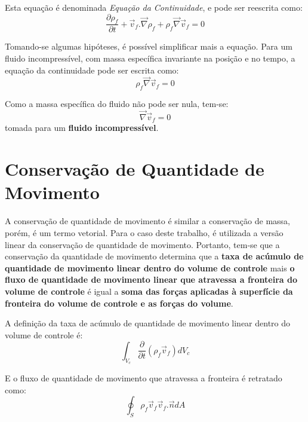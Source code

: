 Esta equação é denominada \textit{Equação da Continuidade}, e pode ser reescrita como:
\begin{equation}
    \dfrac{\partial \rho_f}{\partial t} + \vec{v}_f.\vec{\nabla} \rho_f + \rho_f \vec{\nabla}\vec{v}_f = 0
    \label{continuity}
\end{equation}

Tomando-se algumas hipóteses, é possível simplificar mais a equação.
Para um fluido incompressível, com massa específica invariante na posição e no tempo, a equação da continuidade pode ser escrita como:
\begin{equation}
    \rho_f \vec{\nabla}\vec{v}_f = 0
    \label{continuity_mid}
\end{equation}

Como a massa específica do fluido não pode ser nula, tem-se:
\begin{equation}
    \vec{\nabla}\vec{v}_f = 0
    \label{continuity_final}
\end{equation}
tomada para um \textbf{fluido incompressível}.


\section{\textbf{Conservação de Quantidade de Movimento}}
\label{sec_cons_qmov}
A conservação de quantidade de movimento é similar a conservação de massa, porém, é um termo vetorial.
Para o caso deste trabalho, é utilizada a versão linear da conservação de quantidade de movimento.
Portanto, tem-se que a conservação da quantidade de movimento determina que a \textbf{taxa de acúmulo de quantidade de movimento linear dentro do volume de controle} mais \textbf{o fluxo de quantidade de movimento linear que atravessa a fronteira do volume de controle} é igual a \textbf{soma das forças aplicadas à superfície da fronteira do volume de controle e as forças do volume}.

A definição da taxa de acúmulo de quantidade de movimento linear dentro do volume de controle é:
\begin{equation}
    \int_{V_c}\dfrac{\partial}{\partial t} (\rho_f \vec{v}_f) d V_c
    \label{acumulo_qmov}
\end{equation}

E o fluxo de quantidade de movimento que atravessa a fronteira é retratado como:
\begin{equation}
    \oint_{S}\rho_f \vec{v}_f \vec{v}_f.\vec{n} dA
    \label{fluxo_qmov}
\end{equation}

